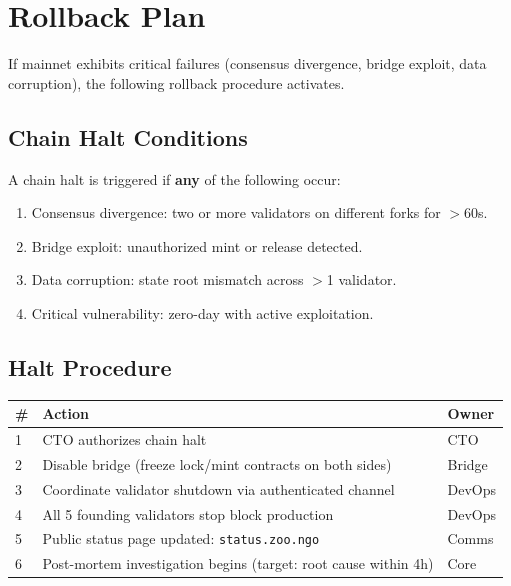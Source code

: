 \section{Rollback Plan}


If mainnet exhibits critical failures (consensus divergence, bridge exploit,
data corruption), the following rollback procedure activates.

\subsection{Chain Halt Conditions}

A chain halt is triggered if \textbf{any} of the following occur:

\begin{enumerate}[nosep]
  \item Consensus divergence: two or more validators on different forks for $>$60s.
  \item Bridge exploit: unauthorized mint or release detected.
  \item Data corruption: state root mismatch across $>$1 validator.
  \item Critical vulnerability: zero-day with active exploitation.
\end{enumerate}

\subsection{Halt Procedure}

\begin{tabularx}{\textwidth}{@{}l X l@{}}
\toprule
\textbf{\#} & \textbf{Action} & \textbf{Owner} \\
\midrule
1 & CTO authorizes chain halt                                          & CTO    \\
2 & Disable bridge (freeze lock/mint contracts on both sides)          & Bridge \\
3 & Coordinate validator shutdown via authenticated channel             & DevOps \\
4 & All 5 founding validators stop block production                    & DevOps \\
5 & Public status page updated: \texttt{status.zoo.ngo}                & Comms  \\
6 & Post-mortem investigation begins (target: root cause within 4h)    & Core   \\
\bottomrule
\end{tabularx}

